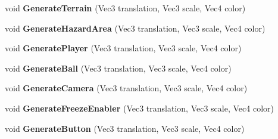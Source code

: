 \begin{DoxyCompactItemize}
\item 
\hypertarget{classDCEngine_1_1DollHouse_a2238a493d2e6e67341ba26811f0b6f2b}{void {\bfseries Generate\-Terrain} (Vec3 translation, Vec3 scale, Vec4 color)}\label{classDCEngine_1_1DollHouse_a2238a493d2e6e67341ba26811f0b6f2b}

\item 
\hypertarget{classDCEngine_1_1DollHouse_ac7c24fd22eb5fb08d11d3e69dc54608a}{void {\bfseries Generate\-Hazard\-Area} (Vec3 translation, Vec3 scale, Vec4 color)}\label{classDCEngine_1_1DollHouse_ac7c24fd22eb5fb08d11d3e69dc54608a}

\item 
\hypertarget{classDCEngine_1_1DollHouse_a7e7e177fcfe7976a0695fd4e5879eedb}{void {\bfseries Generate\-Player} (Vec3 translation, Vec3 scale, Vec4 color)}\label{classDCEngine_1_1DollHouse_a7e7e177fcfe7976a0695fd4e5879eedb}

\item 
\hypertarget{classDCEngine_1_1DollHouse_a5d28b6a03791c8c29aea57cbb1939390}{void {\bfseries Generate\-Ball} (Vec3 translation, Vec3 scale, Vec4 color)}\label{classDCEngine_1_1DollHouse_a5d28b6a03791c8c29aea57cbb1939390}

\item 
\hypertarget{classDCEngine_1_1DollHouse_a5538d70afb2a893240e2f91ab6818366}{void {\bfseries Generate\-Camera} (Vec3 translation, Vec3 scale, Vec4 color)}\label{classDCEngine_1_1DollHouse_a5538d70afb2a893240e2f91ab6818366}

\item 
\hypertarget{classDCEngine_1_1DollHouse_a5bb89933b7c39489db9b0e8c110c6011}{void {\bfseries Generate\-Freeze\-Enabler} (Vec3 translation, Vec3 scale, Vec4 color)}\label{classDCEngine_1_1DollHouse_a5bb89933b7c39489db9b0e8c110c6011}

\item 
\hypertarget{classDCEngine_1_1DollHouse_a54e7a7b4ef7a7b41931ef9eb69ab0494}{void {\bfseries Generate\-Button} (Vec3 translation, Vec3 scale, Vec4 color)}\label{classDCEngine_1_1DollHouse_a54e7a7b4ef7a7b41931ef9eb69ab0494}

\end{DoxyCompactItemize}
